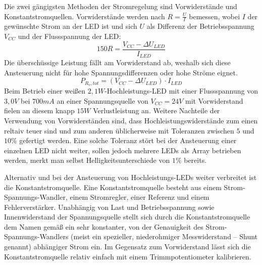 \documentclass[12pt,a4paper,notitlepage]{article}
\begin{document}
Die zwei gängigsten Methoden der Stromregelung sind Vorwiderstände und Konstantstromquellen. Vorwiderstände werden nach $R=\frac{U}{I}$ bemessen, wobei $I$ der gewünschte Strom an der \gls{LED} ist und sich $U$ als Differenz der Betriebsspannung $V_{CC}$ und der \gls{Flussspannung} der \gls{LED}:
\begin{equation}150
R=\frac{V_{CC}-\Delta U_{LED}}{I_{LED}}
\end{equation}
Die überschüssige Leistung fällt am Vorwiderstand ab, weshalb sich diese Ansteuerung nicht für hohe Spannungsdifferenzen oder hohe Ströme eignet.
\begin{equation}
P_{R_v,tot}=\left(V_{CC}-\Delta U_{LED}\right)\cdot I_{LED}
\end{equation}
Beim Betrieb einer weißen $2,1W$-Hochleistungs-\gls{LED} mit einer Flussspannung von $3,0V$ bei $700mA$ an einer Spannungsquelle von $V_{CC}=24V$ mit Vorwiderstand fielen an diesem knapp $15W$ Verlustleistung an.
Weitere Nachteile der Verwendung von Vorwiderständen sind, dass Hochleistungswiderstände zum einen reltaiv teuer sind und zum anderen üblicherweise mit Toleranzen zwischen $5$ und $10\%$ gefertigt werden. Eine solche Toleranz stört bei der Ansteuerung einer einzelnen \gls{LED} nicht weiter, sollen jedoch mehrere \glspl{LED} als Array betrieben werden, merkt man selbst Helligkeitsunterschiede von $1\%$ bereits.

Alternativ und bei der Ansteuerung von Hochleistungs-\glspl{LED} weiter verbreitet ist die Konstantstromquelle. Eine Konstantstromquelle besteht aus einem Strom-Spannungs-Wandler, einem Stromregler, einer Referenz und einem Fehlerverstärker. Unabhängig von Last und Betriebsspannung sowie Innenwiderstand der Spannungsquelle stellt sich durch die Konstantstromquelle dem Namen gemäß ein sehr konstanter, von der Genauigkeit des Strom-Spannungs-Wandlers (meist ein spezieller, niederohmiger Messwiderstand -- \gls{Shunt} genannt) abhängiger Strom ein. Im Gegensatz zum Vorwiderstand lässt sich die Konstantstromquelle relativ einfach mit einem Trimmpotentiometer kalibrieren.
\end{document}
